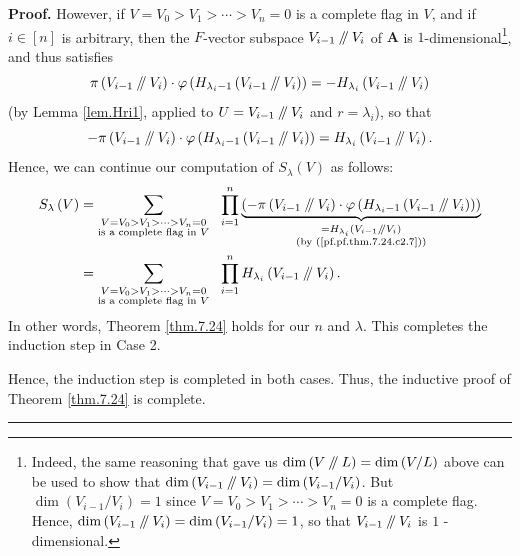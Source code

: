 \documentclass[numbers=enddot,12pt,final,onecolumn,notitlepage]{scrartcl}%
\numberwithin{exer}{section}
\theoremstyle{definition}
\newenvironment{proof}[1][Proof]{\noindent\textbf{#1.} }{\ \rule{0.5em}{0.5em}}
\let\sumnonlimits\sum
\let\prodnonlimits\prod
\renewcommand{\sum}{\sumnonlimits\limits}
\renewcommand{\prod}{\prodnonlimits\limits}
\newcommand{\sslash}{\mathbin{/\mkern-5mu/}}
\theoremstyle{plainsl}
\begin{document}
\begin{proof}
However, if $V=V_{0}>V_{1}>\cdots>V_{n}=0$ is a complete flag in $V$, and if
$i\in\left[  n\right]  $ is arbitrary, then the $F$-vector subspace
$V_{i-1}\sslash V_{i}$ of $\mathbf{A}$ is $1$-dimensional\footnote{Indeed, the
same reasoning that gave us $\dim\left(  V\sslash L\right)  =\dim\left(
V/L\right)  $ above can be used to show that $\dim\left(  V_{i-1}\sslash
V_{i}\right)  =\dim\left(  V_{i-1}/V_{i}\right)  $. But $\dim\left(
V_{i-1}/V_{i}\right)  =1$ since $V=V_{0}>V_{1}>\cdots>V_{n}=0$ is a complete
flag. Hence, $\dim\left(  V_{i-1}\sslash V_{i}\right)  =\dim\left(
V_{i-1}/V_{i}\right)  =1$, so that $V_{i-1}\sslash V_{i}$ is $1$%
-dimensional.}, and thus satisfies
\[
\pi\left(  V_{i-1}\sslash V_{i}\right)  \cdot\varphi\left(  H_{\lambda_{i}%
-1}\left(  V_{i-1}\sslash V_{i}\right)  \right)  =-H_{\lambda_{i}}\left(
V_{i-1}\sslash V_{i}\right)
\]
(by Lemma \ref{lem.Hri1}, applied to $U=V_{i-1}\sslash V_{i}$ and
$r=\lambda_{i}$), so that%
\begin{equation}
-\pi\left(  V_{i-1}\sslash V_{i}\right)  \cdot\varphi\left(  H_{\lambda_{i}%
-1}\left(  V_{i-1}\sslash V_{i}\right)  \right)  =H_{\lambda_{i}}\left(
V_{i-1}\sslash V_{i}\right)  . \label{pf.pf.thm.7.24.c2.7}%
\end{equation}
Hence, we can continue our computation of $S_{\lambda}\left(  V\right)  $ as
follows:%
\begin{align*}
S_{\lambda}\left(  V\right)   &  =\sum_{\substack{V=V_{0}>V_{1}>\cdots
>V_{n}=0\\\text{is a complete flag in }V}}\ \ \prod_{i=1}^{n}%
\underbrace{\left(  -\pi\left(  V_{i-1}\sslash V_{i}\right)  \cdot
\varphi\left(  H_{\lambda_{i}-1}\left(  V_{i-1}\sslash V_{i}\right)  \right)
\right)  }_{\substack{=H_{\lambda_{i}}\left(  V_{i-1}\sslash V_{i}\right)
\\\text{(by (\ref{pf.pf.thm.7.24.c2.7}))}}}\\
&  =\sum_{\substack{V=V_{0}>V_{1}>\cdots>V_{n}=0\\\text{is a complete flag in
}V}}\ \ \prod_{i=1}^{n}H_{\lambda_{i}}\left(  V_{i-1}\sslash V_{i}\right)  .
\end{align*}
In other words, Theorem \ref{thm.7.24} holds for our $n$ and $\lambda$. This
completes the induction step in Case 2.

Hence, the induction step is completed in both cases. Thus, the inductive
proof of Theorem \ref{thm.7.24} is complete.
\end{proof}

\appendix
\end{document}
